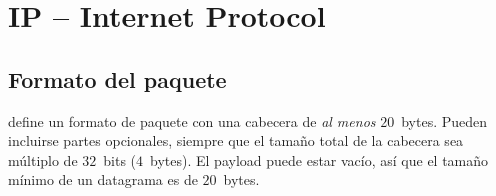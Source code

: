 % 







\section{IP -- Internet Protocol}\label{sec:layer3:ip}

\subsection{Formato del paquete}\label{sec:layer3:ip:format}

 define un formato de paquete con una cabecera 
de \textit{al menos} $20$~bytes. Pueden incluirse partes opcionales,
siempre que el tamaño total de la cabecera sea múltiplo de $32$~bits ($4$~bytes).
El payload puede estar vacío, así que el tamaño mínimo de un datagrama es de $20$~bytes.\\


